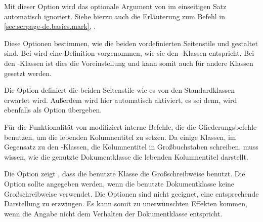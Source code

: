 \begin{Declaration}
\end{Declaration}%
%
%
Mit dieser Option wird das optionale Argument von
 im
einseitigen Satz automatisch ignoriert. Siehe hierzu auch die Erläuterung
zum Befehl  in \autoref{sec:scrpage-de.basics.mark},
.%
%
\EndIndexGroup


\begin{Declaration}
\end{Declaration}%
Diese Optionen bestimmen, wie die beiden vordefinierten Seitenstile
 und  gestaltet sind.
Bei  wird eine Definition vorgenommen, wie
sie den \KOMAScript{}-Klassen entspricht.
Bei den \KOMAScript{}-Klassen ist dies die Voreinstellung und 
kann somit auch für andere Klassen gesetzt werden.

Die Option  definiert die beiden Seitenstile
wie es von den Standardklassen erwartet wird.
Außerdem wird hier automatisch  aktiviert,
es sei denn,  wird ebenfalls als Option übergeben.%
\EndIndexGroup


\begin{Declaration}
\end{Declaration}%
Für die Funktionalität von  modifiziert
 interne Befehle, die die Gliederungsbefehle
benutzen, um die lebenden Kolumnentitel zu setzen.
Da einige Klassen, im Gegensatz
zu den \KOMAScript{}-Klassen, die Kolumnentitel in Großbuchstaben
schreiben, muss  wissen, wie die genutzte
Dokumentklasse die lebenden Kolumnentitel darstellt.

Die Option  zeigt , dass die benutzte
Klasse die Großschreibweise benutzt.  Die Option  sollte
angegeben werden, wenn die benutzte Dokumentklasse keine Großschreibweise
verwendet.  Die Optionen sind nicht geeignet, eine
entsprechende Darstellung zu erzwingen. Es kann somit zu unerwünschten
Effekten kommen, wenn die Angabe nicht dem Verhalten der Dokumentklasse
entspricht.%
\EndIndexGroup



